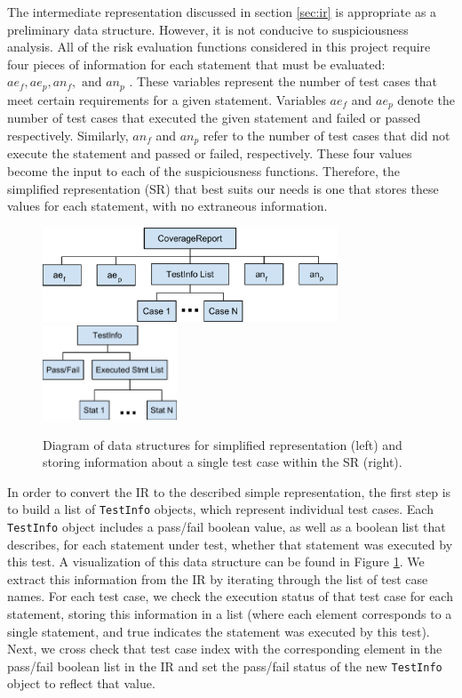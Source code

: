The intermediate representation discussed in section \ref{sec:ir} is appropriate as a preliminary
data structure.  However, it is not conducive to suspiciousness analysis.  All of the risk evaluation
functions considered in this project require four pieces of information for each statement that
must be evaluated: $ae_f, ae_p, an_f, \text{ and } an_p$ \cite{theory}.  These variables represent the number
of test cases that meet certain requirements for a given statement.  Variables $ae_f$ and $ae_p$
denote the number of test cases that executed the given statement and failed or passed
respectively. Similarly, $an_f$ and $an_p$ refer to the number of test cases that did not execute
the statement and passed or failed, respectively.  These four values become the input to each of
the suspiciousness functions.  Therefore, the simplified representation (SR) that best suits our needs
is one that stores these values for each statement, with no extraneous information.

\begin{figure}[tb]
\centering
\includegraphics[height=28mm]{img/CoverageReport.pdf}
\hspace{0.1\linewidth}
\includegraphics[height=28mm]{img/TestInfo.pdf}
\caption{Diagram of data structures for simplified representation (left) and  storing information
about a single test case within the SR (right).}
\label{fig:sr}
\end{figure}

In order to convert the IR to the described simple representation, the first step is to build
a list of \texttt{TestInfo} objects, which represent individual test cases.  Each \texttt{TestInfo}
object includes a pass/fail boolean value, as well as a boolean list that describes, for each
statement under test, whether that statement was executed by this test.  A visualization of this
data structure can be found in Figure \ref{fig:sr}. We extract this information 
from the IR by iterating through the list of test case names.  For each test case, we check the
execution status of that test case for each statement, storing this information in a list (where
each element corresponds to a single statement, and true indicates the statement was executed by this
test).  Next, we cross check that test case index with the corresponding element in the pass/fail
boolean list in the IR and set the pass/fail status of the new \texttt{TestInfo} object to reflect
that value.


